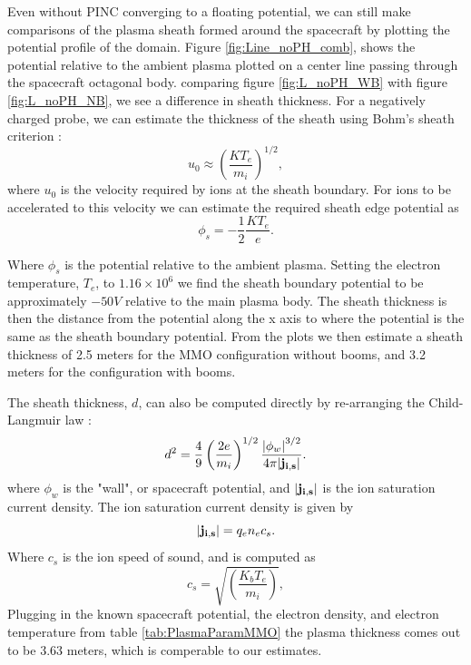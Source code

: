 Even without PINC converging to a floating potential, we can still make comparisons of the plasma sheath formed around the spacecraft by plotting the potential profile of the domain. Figure \ref{fig:Line_noPH_comb}, shows the potential relative to the ambient plasma plotted on a center line passing through the spacecraft octagonal body. comparing figure \ref{fig:L_noPH_WB} with figure \ref{fig:L_noPH_NB}, we see a difference in sheath thickness. For a negatively charged probe, we can estimate the thickness of the sheath using Bohm's sheath criterion \parencite{Chen2018}:
\begin{equation}
    u_0 \approx \left(\frac{K T_e}{m_i}\right)^{1/2},
\end{equation}
where $u_0$ is the velocity required by ions at the sheath boundary. For ions to be accelerated to this velocity we can estimate the required sheath edge potential as
\begin{equation}
    \phi_s = -\frac{1}{2} \frac{K T_e}{e}.
\end{equation}

Where $\phi_s$ is the potential relative to the ambient plasma. Setting the electron temperature, $T_e$, to $1.16 \times 10^6$ we find the sheath boundary potential to be approximately $-50 V$ relative to the main plasma body. The sheath thickness is then the distance from the potential along the x axis to where the potential is the same as the sheath boundary potential. From the plots we then estimate a sheath thickness of 2.5 meters for the MMO configuration without booms, and 3.2 meters for the configuration with booms.

The sheath thickness, $d$, can also be computed directly by re-arranging the Child-Langmuir law \parencite{Chen2018}:
\begin{equation}
    d^2 = \frac{4}{9} \left(\frac{2e}{m_i}\right)^{1/2} \frac{\abs{\phi_w}^{3/2}}{4 \pi \abs{\vb{j_{i,s}}}}.
\end{equation}
where $\phi_w$ is the "wall", or spacecraft potential, and $\abs{\vb{j_{i,s}}}$ is the ion saturation current density. The ion saturation current density is given by
\begin{equation}
    \abs{\vb{j_{i,s}}} = q_e n_e c_s.
\end{equation}
Where $c_s$ is the ion speed of sound, and is computed as \parencite{Paulsson2019}
\begin{equation}\label{eq:ionMach}
    c_s = \sqrt{\left(\frac{K_b T_e}{m_i}\right)},
\end{equation}
Plugging in the known spacecraft potential, the electron density, and electron temperature from table \ref{tab:PlasmaParamMMO}  the plasma thickness comes out to be 3.63 meters, which is comperable to our estimates. 

